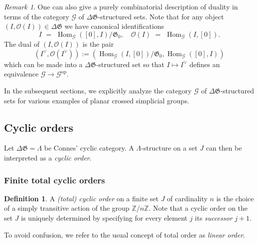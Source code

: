 \documentclass[english,11pt,leqno]{article}
\def\ZZ{\mathbb{Z}}
\def\Gen{\mathfrak{G}}
\def\Gc{\mathcal{G}}
\def\Oc{\mathcal{O}}
\def\Hom{\operatorname{Hom}}
\def\op{{\operatorname{op}}}
\def\Hom{\operatorname{Hom}}
\def\O{{\mathcal O}}
\def\G{ {\mathcal G}}
\def\DG{ {\Delta \Gen}}
\theoremstyle{definition}
\newtheorem{defi}[thm]{Definition}
\theoremstyle{remark}
\newtheorem{rem}[thm]{Remark}
\numberwithin{equation}{section}
\begin{document}
\begin{rem} One can also give a purely combinatorial description of duality in terms of the
category $\Gc$ of $\DG$-structured sets. Note that for any object $(I, \Oc(I))\in\DG$ we
have canonical identifications
\[
I \,\,=\,\, \Hom_\Gc([0], I)/\Gen_0, \quad \Oc(I) \,\,=\,\, \Hom_\Gc(I, [0]). 
\]
The dual of $(I, \O(I))$ is the pair
\[
	(I^{\vee}, \O(I^{\vee})) := (\Hom_{\G}(I, [0])/\Gen_0, \Hom_{\G}([0],I))
\]
which can be made into a $\DG$-structured set so that $I \mapsto I^{\vee}$ defines an equivalence
$\G \to \G^{\op}$.
\end{rem}
	
In the subsequent sections, we explicitly analyze the category $\G$ of $\DG$-structured sets for
various examples of planar crossed simplicial groups.

\subsection{Cyclic orders}\label{sec:cycorder}

Let $\DG = \Lambda$ be Connes' cyclic category. A $\Lambda$-structure on a set $J$ can then be
interpreted as a {\em cyclic order}. 

\subsubsection{Finite total cyclic orders}

\begin{defi}\label{def:totalcyclic} A {\em (total) cyclic order} on a finite set $J$ of cardinality $n$ is 
the choice of a simply transitive action of the group $\ZZ/n\ZZ$. Note that a cyclic order on the set $J$ 
is uniquely determined by specifying for every element $j$ its {\em successor} $j + 1$.
\end{defi}

To avoid confusion, we refer to the usual concept of total order as {\em linear order}.
\end{document}
